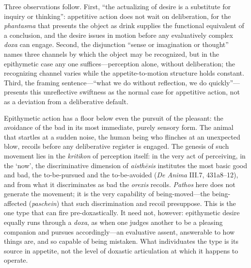 \documentclass{article}
\begin{document}
Three observations follow. First, ``the actualizing of desire is a substitute for inquiry or thinking'': appetitive action does not wait on deliberation, for the \textit{phantasma} that presents the object as drink supplies the functional equivalent of a conclusion, and the desire issues in motion before any evaluatively complex \textit{doxa} can engage. Second, the disjunction ``sense or imagination or thought'' names three channels by which the object may be recognized, but in the epithymetic case any one suffices---perception alone, without deliberation; the recognizing channel varies while the appetite-to-motion structure holds constant. Third, the framing sentence---``what we do without reflection, we do quickly''---presents this unreflective swiftness as the normal case for appetitive action, not as a deviation from a deliberative default.

Epithymetic action has a floor below even the pursuit of the pleasant: the avoidance of the bad in its most immediate, purely sensory form. The animal that startles at a sudden noise, the human being who flinches at an unexpected blow, recoils before any deliberative register is engaged. The genesis of such movement lies in the \textit{kritikon} of perception itself: in the very act of perceiving, in the `now', the discriminative dimension of \textit{aisthēsis} institutes the most basic good and bad, the to-be-pursued and the to-be-avoided (\textit{De Anima} III.7, 431a8--12), and from what it discriminates as bad the \textit{orexis} recoils. \textit{Pathos} here does not generate the movement; it is the very capability of being-moved---the being-affected (\textit{paschein}) that such discrimination and recoil presuppose. This is the one type that can fire pre-doxastically. It need not, however: epithymetic desire equally runs through a \textit{doxa}, as when one judges another to be a pleasing companion and pursues accordingly---an evaluative assent, answerable to how things are, and so capable of being mistaken. What individuates the type is its source in appetite, not the level of doxastic articulation at which it happens to operate.
\end{document}
